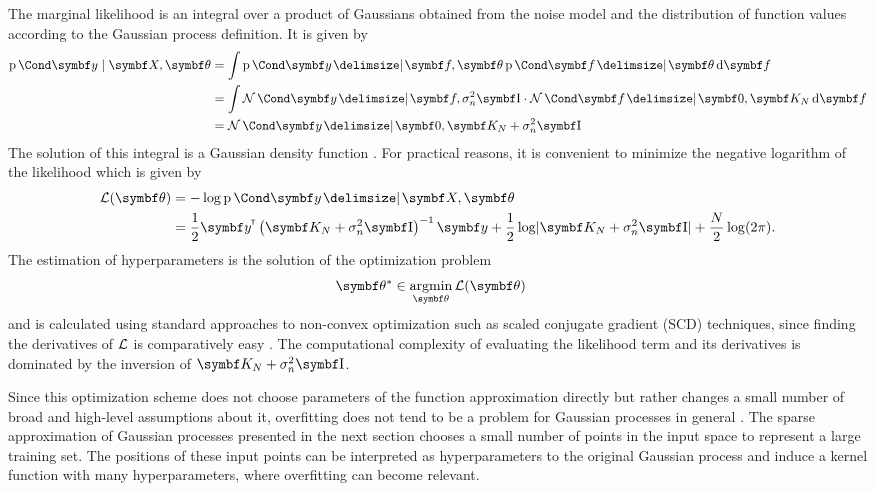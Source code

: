 The marginal likelihood is an integral over a product of Gaussians obtained from the noise model and the distribution of function values according to the Gaussian process definition.
It is given by
\begin{align}
    \begin{split}
        \label{eq:gp_f_marginalization}
        \Prob{\mat{y} \mid \mat{X}, \mat{\theta}} &= \int \Prob{\mat{y} \given \mat{f}, \mat{\theta}} \Prob{\mat{f} \given \mat{\theta}} \diff \mat{f} \\
        &= \int \Gaussian{\mat{y} \given \mat{f}, \sigma_n^2 \Eye} \cdot \Gaussian{\mat{f} \given \mat{0}, \mat{K_N}} \diff \mat{f} \\
        &= \Gaussian{\mat{y} \given \mat{0}, \mat{K_N} + \sigma_n^2 \Eye}
    \end{split}
\end{align}
The solution of this integral is a Gaussian density function \cite{petersen_matrix_2008}.
For practical reasons, it is convenient to minimize the negative logarithm of the likelihood which is given by
\begin{align}
    \begin{split}
        \Lc(\mat{\theta}) &= -\log\Prob{\mat{y} \given \mat{X}, \mat{\theta}} \\
        &= \frac{1}{2} \mat{y}\tran \left( \mat{K_N} + \sigma_n^2 \Eye \right)^{-1} \mat{y} +
        \frac{1}{2} \log \abs{\mat{K_N} + \sigma_n^2 \Eye} +
        \frac{N}{2} \log(2\pi).
    \end{split}
\end{align}
The estimation of hyperparameters is the solution of the optimization problem
\begin{align}
    \mat{\theta}^\ast &\in \argmin_{\mat{\theta}} \Lc(\mat{\theta})
\end{align}
and is calculated using standard approaches to non-convex optimization such as scaled conjugate gradient (SCD) techniques, since finding the derivatives of $\mathcal{L}$ is comparatively easy \cite{rasmussen_gaussian_2006}.
The computational complexity of evaluating the likelihood term and its derivatives is dominated by the inversion of $\mat{K_N} + \sigma_n^2 \Eye$.

Since this optimization scheme does not choose parameters of the function approximation directly but rather changes a small number of broad and high-level assumptions about it, overfitting does not tend to be a problem for Gaussian processes in general \cite{snelson_flexible_2007}.
The sparse approximation of Gaussian processes presented in the next section chooses a small number of points in the input space to represent a large training set.
The positions of these input points can be interpreted as hyperparameters to the original Gaussian process and induce a kernel function with many hyperparameters, where overfitting can become relevant.


